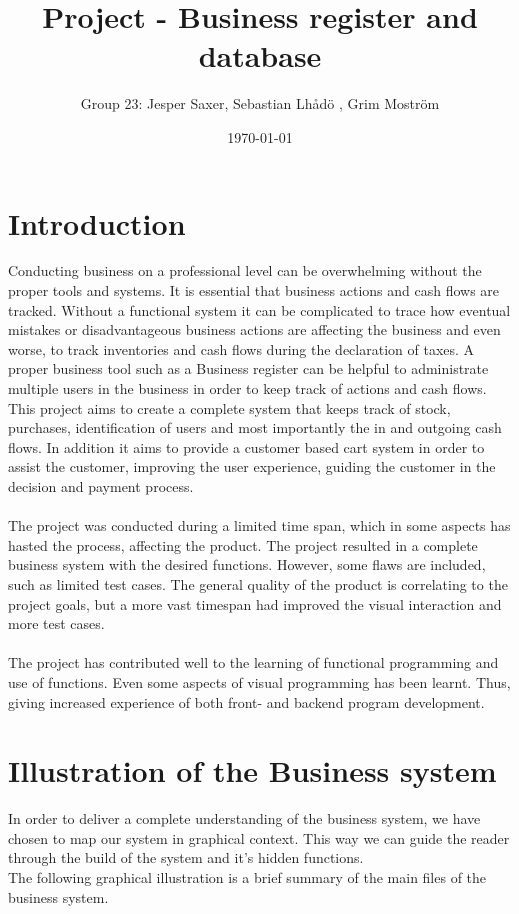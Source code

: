 \documentclass[11pt]{article}
\begin{document}
\title{Project - Business register and database}
\author{Group 23: Jesper Saxer, Sebastian Lhådö , Grim Moström}
\date{\today}
\maketitle{}
\newpage
\section{Introduction}
Conducting business on a professional level can be overwhelming without the proper tools and systems. It is essential that business actions and cash flows are tracked. Without  a functional system it can be complicated to trace how eventual mistakes or disadvantageous business actions are affecting the business and even worse, to track inventories and cash flows during the declaration of taxes. A proper business tool such as a Business register can be helpful to administrate multiple users in the business in order to keep track of actions and cash flows.
This project aims to create a complete system that keeps track of stock, purchases, identification of users and most importantly the in and outgoing cash flows. In addition it aims to provide a customer based cart system in order to assist the customer, improving the user experience, guiding the customer in the decision and payment process.\\\\
The project was conducted during a limited time span, which in some aspects has hasted the process, affecting the product. The project resulted in a complete business system with the desired functions. However, some flaws are included, such as limited test cases. The general quality of the product is correlating to the project goals, but a more vast timespan had improved the visual interaction and more test cases.\\\\
The project has contributed well to the learning of functional programming and use of functions. Even some aspects of visual programming has been learnt. Thus, giving increased experience of both front- and backend program development.
\newpage
\tableofcontents
\newpage
\section{Illustration of the Business system}
In order to deliver a complete understanding of the business system, we have chosen to map our system in graphical context. This way we can guide the reader through the build of the system and it’s hidden functions.
\\
The following graphical illustration is a brief summary of the main files of the business system.
\end{document}
